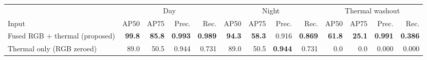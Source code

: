 \begin{tabular}{lrrrrrrrrrrrr}
\toprule
& \multicolumn{4}{c}{Day} & \multicolumn{4}{c}{Night} & \multicolumn{4}{c}{Thermal washout}\\
\cmidrule(lr){2-5}\cmidrule(lr){6-9}\cmidrule(lr){10-13}
Input & AP50 & AP75 & Prec. & Rec. & AP50 & AP75 & Prec. & Rec. & AP50 & AP75 & Prec. & Rec.\\
\midrule
Fused RGB + thermal (proposed) & \textbf{99.8} & \textbf{85.8} & \textbf{0.993} & \textbf{0.989} & \textbf{94.3} & \textbf{58.3} & 0.916 & \textbf{0.869} & \textbf{61.8} & \textbf{25.1} & \textbf{0.991} & \textbf{0.386} \\
Thermal only (RGB zeroed) & 89.0 & 50.5 & 0.944 & 0.731 & 89.0 & 50.5 & \textbf{0.944} & 0.731 & 0.0 & 0.0 & 0.000 & 0.000 \\
\bottomrule
\end{tabular}
